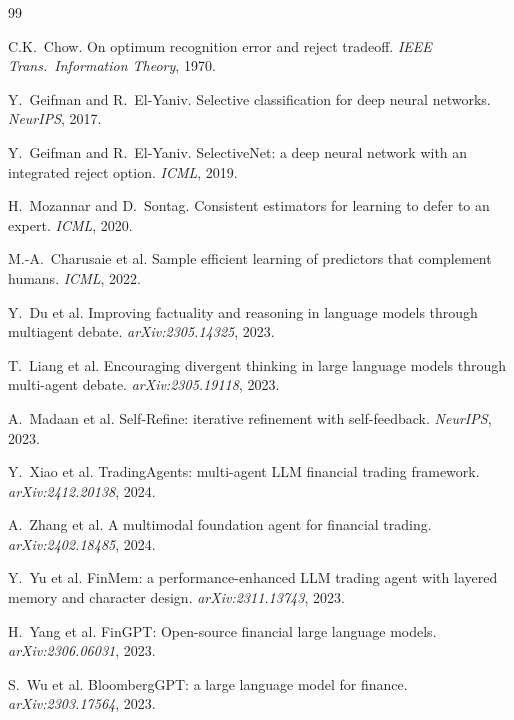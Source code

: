 \documentclass[11pt,a4paper]{article}
\begin{document}

\begin{thebibliography}{99}\footnotesize

C.K.~Chow. On optimum recognition error and reject tradeoff.
\emph{IEEE Trans.\ Information Theory}, 1970.

Y.~Geifman and R.~El-Yaniv. Selective classification for deep neural networks.
\emph{NeurIPS}, 2017.

Y.~Geifman and R.~El-Yaniv. SelectiveNet: a deep neural network with an
integrated reject option. \emph{ICML}, 2019.

H.~Mozannar and D.~Sontag. Consistent estimators for learning to defer to
an expert. \emph{ICML}, 2020.

M.-A.~Charusaie et al. Sample efficient learning of predictors that complement
humans. \emph{ICML}, 2022.

Y.~Du et al. Improving factuality and reasoning in language models through
multiagent debate. \emph{arXiv:2305.14325}, 2023.

T.~Liang et al. Encouraging divergent thinking in large language models
through multi-agent debate. \emph{arXiv:2305.19118}, 2023.

A.~Madaan et al. Self-Refine: iterative refinement with self-feedback.
\emph{NeurIPS}, 2023.

Y.~Xiao et al. TradingAgents: multi-agent LLM financial trading framework.
\emph{arXiv:2412.20138}, 2024.

A.~Zhang et al. A multimodal foundation agent for financial trading.
\emph{arXiv:2402.18485}, 2024.

Y.~Yu et al. FinMem: a performance-enhanced LLM trading agent with
layered memory and character design. \emph{arXiv:2311.13743}, 2023.

H.~Yang et al. FinGPT: Open-source financial large language models.
\emph{arXiv:2306.06031}, 2023.

S.~Wu et al. BloombergGPT: a large language model for finance.
\emph{arXiv:2303.17564}, 2023.


\end{thebibliography}
\end{document}
